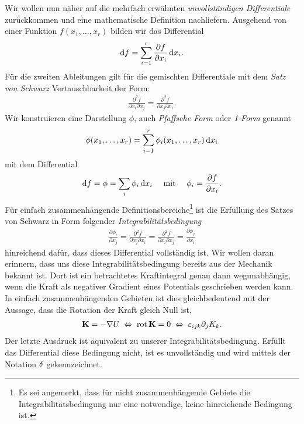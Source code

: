 Wir wollen nun näher auf die mehrfach erwähnten \emph{unvollständigen Differentiale} zurückkommen und eine mathematische Definition nachliefern. Ausgehend von einer Funktion $f(x_1,\ldots,x_r)$ bilden wir das Differential
\begin{align*}
    \mathop{}\!\mathrm{d} f = \sum_{i=1}^r \frac{\partial f}{\partial x_i} \mathop{}\!\mathrm{d} x_i.
\end{align*}
Für die zweiten Ableitungen gilt für die gemischten Differentiale mit dem \emph{Satz von Schwarz} Vertauschbarkeit der Form:
\begin{align*}
    \frac{\partial ^2 f}{\partial x_i \partial x_j} = \frac{\partial ^2 f}{\partial x_j \partial x_i}.
\end{align*}
Wir konstruieren eine Darstellung $\phi$, auch \emph{Pfaffsche Form} oder \emph{1-Form} genannt
\begin{align*}
    \phi (x_1,\ldots,x_r)=\sum _{i=1}^r \phi_i(x_1,\ldots,x_r)\mathop{}\!\mathrm{d} x_i
\end{align*}
mit dem Differential
\begin{align*}
    \mathop{}\!\mathrm{d} f = \phi = \sum_i \phi_i \mathop{}\!\mathrm{d} x_i \quad\text{ mit }\quad \phi_i = \frac{\partial f}{\partial x_i}.
\end{align*}
Für einfach zusammenhängende Definitionsbereiche\footnote{Es sei angemerkt, dass für nicht zusammenhängende Gebiete die Integrabilitätsbedingung nur eine notwendige, keine hinreichende Bedingung ist.} ist die Erfüllung des Satzes von Schwarz in Form folgender \emph{Integrabilitätsbedingung}
\begin{align*}
    \frac{\partial \phi_i}{\partial x_j}=\frac{\partial^2f}{\partial x_j\partial x_i}=\frac{\partial^2f}{\partial x_i\partial x_j}=\frac{\partial \phi_j}{\partial x_i}
\end{align*}
hinreichend dafür, dass dieses Differential vollständig ist.
Wir wollen daran erinnern, dass uns diese Integrabilitätsbedingung bereits aus der Mechanik bekannt ist. Dort ist ein betrachtetes Kraftintegral genau dann wegunabhängig, wenn die Kraft als negativer Gradient eines Potentials geschrieben werden kann. In einfach zusammenhängenden Gebieten ist dies gleichbedeutend mit der Aussage, dass die Rotation der Kraft gleich Null ist,
\begin{align*}
    \mathbf{K}=-\nabla U \;\Leftrightarrow\; \operatorname{rot}\mathbf{K}=0 \;\Leftrightarrow\; \varepsilon_{ijk}\partial_jK_k.
\end{align*}
Der letzte Ausdruck ist äquivalent zu unserer Integrabilitätsbedingung.
Erfüllt das Differential diese Bedingung nicht, ist es unvollständig und wird mittels der Notation $\mathop{}\!\delta$ gekennzeichnet.

